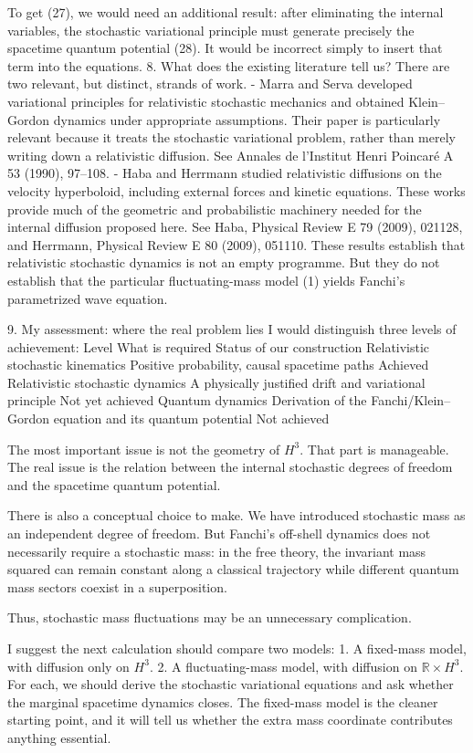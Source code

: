 To get (27), we would need an additional result: after eliminating the internal variables, the stochastic variational principle must generate precisely the spacetime quantum potential (28). It would be incorrect simply to insert that term into the equations.
8. What does the existing literature tell us?
There are two relevant, but distinct, strands of work.
- Marra and Serva developed variational principles for relativistic stochastic mechanics and obtained Klein–Gordon dynamics under appropriate assumptions. Their paper is particularly relevant because it treats the stochastic variational problem, rather than merely writing down a relativistic diffusion. See Annales de l'Institut Henri Poincaré A 53 (1990), 97–108.
- Haba and Herrmann studied relativistic diffusions on the velocity hyperboloid, including external forces and kinetic equations. These works provide much of the geometric and probabilistic machinery needed for the internal diffusion proposed here. See Haba, Physical Review E 79 (2009), 021128, and Herrmann, Physical Review E 80 (2009), 051110.
These results establish that relativistic stochastic dynamics is not an empty programme. But they do not establish that the particular fluctuating-mass model (1) yields Fanchi's parametrized wave equation.

9. My assessment: where the real problem lies
I would distinguish three levels of achievement:
Level	What is required	Status of our construction
Relativistic stochastic kinematics	Positive probability, causal spacetime paths	Achieved
Relativistic stochastic dynamics	A physically justified drift and variational principle	Not yet achieved
Quantum dynamics	Derivation of the Fanchi/Klein–Gordon equation and its quantum potential	Not achieved

The most important issue is not the geometry of \(H^3\). That part is manageable. The real issue is the relation between the internal stochastic degrees of freedom and the spacetime quantum potential.

There is also a conceptual choice to make. We have introduced stochastic mass as an independent degree of freedom. But Fanchi's off-shell dynamics does not necessarily require a stochastic mass: in the free theory, the invariant mass squared can remain constant along a classical trajectory while different quantum mass sectors coexist in a superposition.

Thus, stochastic mass fluctuations may be an unnecessary complication.

I suggest the next calculation should compare two models:
1. A fixed-mass model, with diffusion only on \(H^3\).
2. A fluctuating-mass model, with diffusion on \(\mathbb R\times H^3\).
For each, we should derive the stochastic variational equations and ask whether the marginal spacetime dynamics closes. The fixed-mass model is the cleaner starting point, and it will tell us whether the extra mass coordinate contributes anything essential.

